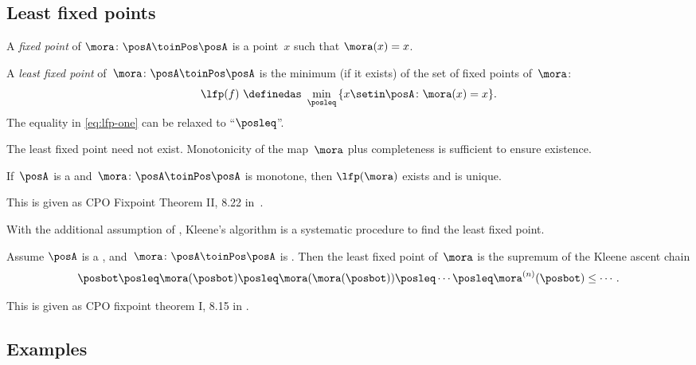 \subsection{Least fixed points}

\begin{definition}
    \label{def:least-fixed}
    A \emph{fixed point} of $\mora\colon\posA\toinPos\posA$ is a point~$x$ such that $\mora(x)=x$.

    A \emph{least fixed point} of~$\mora\colon\posA\toinPos\posA$ is the minimum (if it exists) of the set of fixed points of~$\mora$:
    \begin{equation}
        \label{eq:lfp-one}
        \lfp(f)\,\,\definedas\,\,\min_{\posleq}\,\{x\setin\posA\colon \mora(x)=x\}.
    \end{equation}
    The equality in \cref{eq:lfp-one} can be relaxed to ``$\posleq$''.
\end{definition}

The least fixed point need not exist.
Monotonicity of the map~$\mora$ plus completeness is sufficient to ensure existence.

\begin{lemma}
    \label{lem:CPO-fix-point-2}
    If~$\posA$ is a \CPO and~$\mora\colon\posA\toinPos\posA$
    is monotone, then $\lfp(\mora)$ exists and is unique.
\end{lemma}
This is given as CPO Fixpoint Theorem II, 8.22 in~\cite{davey02}.

With the additional assumption of \scottcontinuity, Kleene's algorithm is a systematic procedure to find the least fixed point.

\begin{lemma}
    \label{lem:kleene-1}
    Assume $\posA$ is a \CPO, and~$\mora\colon\posA\toinPos\posA$ is \scottcontinuous.
    Then the least fixed point of~$\mora$ is the supremum of the Kleene ascent chain
    \begin{equation*}
        \posbot\posleq \mora(\posbot)\posleq \mora(\mora(\posbot))\posleq\cdots\posleq \mora^{(n)}(\posbot)\leq\cdots.
    \end{equation*}
\end{lemma}
This is given as CPO fixpoint theorem I, 8.15 in \cite{davey02}.

\subsection{Examples}

